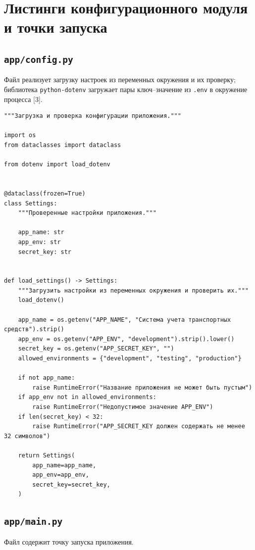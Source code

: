 \documentclass[12pt,a4paper]{article}
\begin{document}
\section{Листинги конфигурационного модуля и точки запуска}

\subsection{\texttt{app/\allowbreak{}config.\allowbreak{}py}}

Файл реализует загрузку настроек из переменных окружения и их проверку; библиотека \texttt{python-dotenv} загружает пары ключ–значение из \texttt{.\allowbreak{}env} в окружение процесса [3].

\begin{lstlisting}
"""Загрузка и проверка конфигурации приложения."""

import os
from dataclasses import dataclass

from dotenv import load_dotenv


@dataclass(frozen=True)
class Settings:
    """Проверенные настройки приложения."""

    app_name: str
    app_env: str
    secret_key: str


def load_settings() -> Settings:
    """Загрузить настройки из переменных окружения и проверить их."""
    load_dotenv()

    app_name = os.getenv("APP_NAME", "Система учета транспортных средств").strip()
    app_env = os.getenv("APP_ENV", "development").strip().lower()
    secret_key = os.getenv("APP_SECRET_KEY", "")
    allowed_environments = {"development", "testing", "production"}

    if not app_name:
        raise RuntimeError("Название приложения не может быть пустым")
    if app_env not in allowed_environments:
        raise RuntimeError("Недопустимое значение APP_ENV")
    if len(secret_key) < 32:
        raise RuntimeError("APP_SECRET_KEY должен содержать не менее 32 символов")

    return Settings(
        app_name=app_name,
        app_env=app_env,
        secret_key=secret_key,
    )
\end{lstlisting}

\subsection{\texttt{app/\allowbreak{}main.\allowbreak{}py}}

Файл содержит точку запуска приложения.
\end{document}
